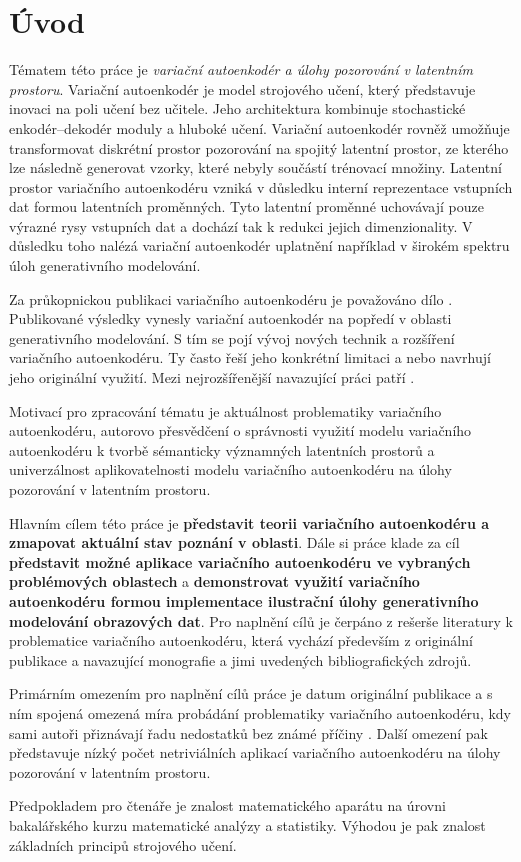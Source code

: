 \chapter*{Úvod}
Tématem této práce je \emph{variační autoenkodér a úlohy pozorování v latentním prostoru}.
Variační autoenkodér je model strojového učení, který představuje inovaci na poli učení bez učitele.
Jeho architektura kombinuje stochastické enkodér–dekodér moduly a hluboké učení.
Variační autoenkodér rovněž umožňuje transformovat diskrétní prostor pozorování na spojitý latentní prostor, ze kterého lze následně generovat vzorky, které nebyly součástí trénovací množiny.
Latentní prostor variačního autoenkodéru vzniká v důsledku interní reprezentace vstupních dat formou latentních proměnných.
Tyto latentní proměnné uchovávají pouze výrazné rysy vstupních dat a dochází tak k redukci jejich dimenzionality.
V důsledku toho nalézá variační autoenkodér uplatnění například v širokém spektru úloh generativního modelování.

Za průkopnickou publikaci variačního autoenkodéru je považováno dílo \textcite{Kingma2014}.
Publikované výsledky vynesly variační autoenkodér na popředí v oblasti generativního modelování.
S tím se pojí vývoj nových technik a rozšíření variačního autoenkodéru.
Ty často řeší jeho konkrétní limitaci a nebo navrhují jeho originální využití.
Mezi nejrozšířenější navazující práci patří \textcite{Sohn2015}.

Motivací pro zpracování tématu je aktuálnost problematiky variačního autoenkodéru,
autorovo přesvědčení o správnosti využití modelu variačního autoenkodéru k tvorbě sémanticky významných latentních prostorů
a univerzálnost aplikovatelnosti modelu variačního autoenkodéru na úlohy pozorování v latentním prostoru.

Hlavním cílem této práce je \textbf{představit teorii variačního autoenkodéru a zmapovat aktuální stav poznání v oblasti}.
Dále si práce klade za cíl \textbf{představit možné aplikace variačního autoenkodéru ve vybraných problémových oblastech} a \textbf{demonstrovat využití variačního autoenkodéru formou implementace ilustrační úlohy generativního modelování obrazových dat}.
Pro naplnění cílů je čerpáno z rešerše literatury k problematice variačního autoenkodéru, která vychází především z originální publikace \textcite{Kingma2014} a navazující monografie \textcite{Kingma2019} a jimi uvedených bibliografických zdrojů.

Primárním omezením pro naplnění cílů práce je datum originální publikace a s ním spojená omezená míra probádání problematiky variačního autoenkodéru, kdy sami autoři přiznávají řadu nedostatků bez známé příčiny \cite{Kingma2019}.
Další omezení pak představuje nízký počet netriviálních aplikací variačního autoenkodéru na úlohy pozorování v latentním prostoru.

Předpokladem pro čtenáře je znalost matematického aparátu na úrovni bakalářského kurzu matematické analýzy a statistiky.
Výhodou je pak znalost základních principů strojového učení.